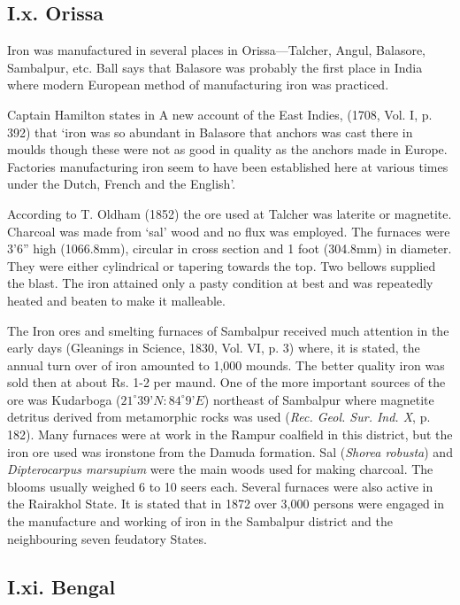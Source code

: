 \subsection*{I.x.  Orissa}\label{subsection-10}

Iron was manufactured in several places in Orissa—Talcher, Angul, Balasore, Sambalpur, etc. Ball says that Balasore was probably the first place in India where modern European method of manufacturing iron was practiced.

Captain Hamilton states in A new account of the East Indies, (1708, Vol. I, p. 392) that ‘iron was so abundant in Balasore that anchors was cast there in moulds though these were not as good in quality as the anchors made in Europe. Factories manufacturing iron seem to have been established here at various times under the Dutch, French and the English’. 

According to T. Oldham (1852) the ore used at Talcher was laterite or magnetite. Charcoal was made from ‘sal’ wood and no flux was employed. The furnaces were 3'6'' high (1066.8mm), circular in cross section and 1 foot (304.8mm) in diameter. They were either cylindrical or tapering towards the top. Two bellows supplied the blast. The iron attained only a pasty condition at best and was repeatedly heated and beaten to make it malleable.

The Iron ores and smelting furnaces of Sambalpur received much attention in the early days (Gleanings in Science, 1830, Vol. VI, p. 3) where, it is stated, the annual turn over of iron amounted to 1,000 mounds. The better quality iron was sold then at about Rs. 1-2 per maund. One of the more important sources of the ore was Kudarboga ($21^\circ 39’N: 84^\circ 9’E$) northeast of Sambalpur where magnetite detritus derived from metamorphic rocks was used ({\it Rec. Geol. Sur. Ind. X}, p. 182). Many furnaces were at work in the Rampur coalfield in this district, but the iron ore used was ironstone from the Damuda formation. Sal ({\it Shorea robusta}) and {\it Dipterocarpus marsupium} were the main woods used for making charcoal. The blooms usually weighed 6 to 10 seers each. Several furnaces were also active in the Rairakhol State. It is stated that in 1872 over 3,000 persons were engaged in the manufacture and working of iron in the Sambalpur district and the neighbouring seven feudatory States.

\subsection*{I.xi.  Bengal}\label{subsection-11}

